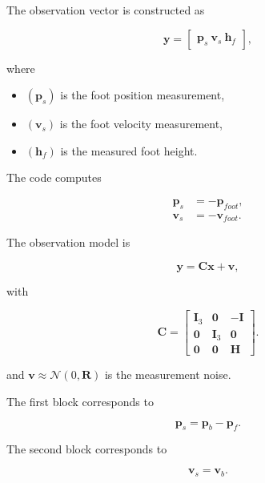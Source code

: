 The observation vector is constructed as

\begin{equation}
\mathbf{y}
=
\begin{bmatrix}
\mathbf{p}_s \
\mathbf{v}_s \
\mathbf{h}_f
\end{bmatrix},
\end{equation}

where

\begin{itemize}
\item $(\mathbf{p}_s)$ is the foot position measurement,
\item $(\mathbf{v}_s)$ is the foot velocity measurement,
\item $(\mathbf{h}_f)$ is the measured foot height.
\end{itemize}

The code computes

\begin{align}
\mathbf{p}_s &= -\mathbf{p}_{foot}, \\
\mathbf{v}_s &= -\mathbf{v}_{foot}.
\end{align}

The observation model is

\begin{equation}
\mathbf{y}
=
\mathbf{C}\mathbf{x} + \mathbf{v},
\end{equation}

with

\begin{equation}
\mathbf{C} = \begin{bmatrix}
\mathbf{I}_3 & \mathbf{0} & -\mathbf{I} \\
\mathbf{0} & \mathbf{I}_3 & \mathbf{0} \\
\mathbf{0} & \mathbf{0} & \mathbf{H}
\end{bmatrix}.
\end{equation}

and $\mathbf{v} \approx \mathcal{N}(0, \mathbf{R})$ is the measurement noise.

The first block corresponds to

\begin{equation}
\mathbf{p}_{s}
=
\mathbf{p}_b
-
\mathbf{p}_f.
\end{equation}

The second block corresponds to

\begin{equation}
\mathbf{v}_{s}
=
\mathbf{v}_b.
\end{equation}

